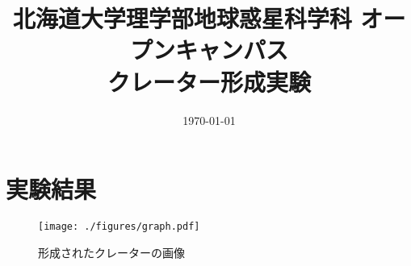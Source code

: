 \documentclass[a4paper]{ltjsarticle}
\begin{document}
\title{北海道大学理学部地球惑星科学科 オープンキャンパス\\クレーター形成実験}
\date{\today}
\maketitle

\section{実験結果}
\begin{figure}[H]
    \centering
    \texttt{[image: ./figures/graph.pdf]}
    \caption{形成されたクレーターの画像}
\end{figure}
\end{document}
